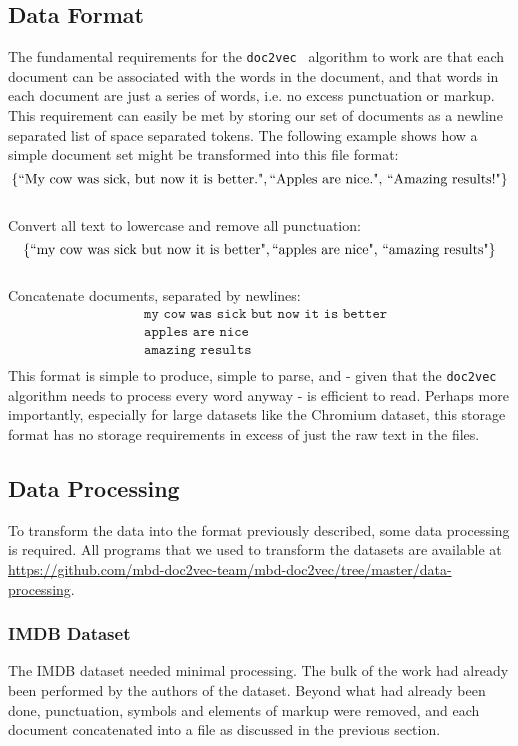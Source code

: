 \documentclass[11pt]{article}
\begin{document}
\subsection*{Data Format}
The fundamental requirements for the \texttt{doc2vec}~\cite{le2014distributed}
algorithm to work are that each document can be associated with the words in the
document, and that words in each document are just a series of words, i.e. no
excess punctuation or markup.\\
This requirement can easily be met by storing our set of documents as a newline
separated list of space separated tokens. The following example shows how a
simple document set might be transformed into this file format:\\
$$ \{\text{``My cow was sick, but now it is better."},
    \text{``Apples are nice.",
    \text{``Amazing results!"}}\} $$\\
Convert all text to lowercase and remove all punctuation:\\
$$ \{\text{``my cow was sick but now it is better"},
    \text{``apples are nice",
    \text{``amazing results"}}\} $$\\
Concatenate documents, separated by newlines:\\
\begin{align*}&\texttt{my cow was sick but now it is better}\\
&\texttt{apples are nice}\\
&\texttt{amazing results}\\\end{align*}
This format is simple to produce, simple to parse, and - given that the
\texttt{doc2vec} algorithm needs to process every word anyway - is efficient
to read. Perhaps more importantly, especially for large datasets like the
Chromium dataset, this storage format has no storage requirements in excess
of just the raw text in the files.

\subsection*{Data Processing}
To transform the data into the format previously described, some data processing
is required. All programs that we used to transform the datasets are available at
\url{https://github.com/mbd-doc2vec-team/mbd-doc2vec/tree/master/data-processing}.

\subsubsection*{IMDB Dataset}
The IMDB dataset needed minimal processing. The bulk of the work had already been
performed by the authors of the dataset. Beyond what had already been done,
punctuation, symbols and elements of markup were removed, and each document
concatenated into a file as discussed in the previous section.
\end{document}

